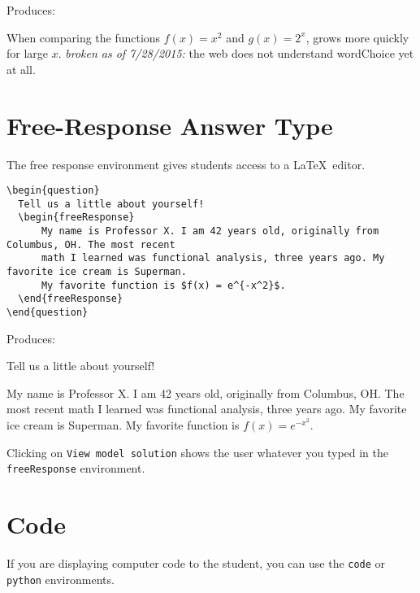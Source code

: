 \documentclass{ximera}
\begin{document}
Produces:

\begin{question}
  When comparing the functions $f(x) = x^2$ and $g(x) = 2^x$,  grows more quickly for large $x$.
  \emph{broken as of 7/28/2015:} the web does not understand wordChoice yet at all.
\end{question}

\section{Free-Response Answer Type}

The free response environment gives students access to a \LaTeX\ editor. 

\begin{verbatim}
\begin{question}
  Tell us a little about yourself!
  \begin{freeResponse}
      My name is Professor X. I am 42 years old, originally from Columbus, OH. The most recent 
      math I learned was functional analysis, three years ago. My favorite ice cream is Superman. 
      My favorite function is $f(x) = e^{-x^2}$.
  \end{freeResponse}
\end{question}
\end{verbatim}

Produces:

\begin{question}
  Tell us a little about yourself!
  \begin{freeResponse}
      My name is Professor X. I am 42 years old, originally from Columbus, OH. The most recent 
      math I learned was functional analysis, three years ago. My favorite ice cream is Superman. 
      My favorite function is $f(x) = e^{-x^2}.$
  \end{freeResponse}
\end{question}

\begin{remark}
Clicking on \verb!View model solution! shows the user
whatever you typed in the  \verb!freeResponse! environment.
\end{remark}


\section{Code}

If you are displaying computer code to the student, you can use the \verb!code! or \verb!python! environments.
\end{document}
